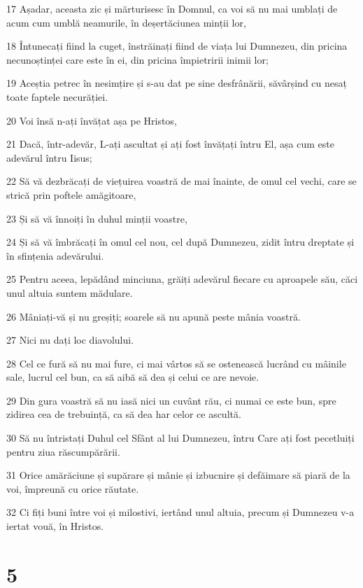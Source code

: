 \par 17 Așadar, aceasta zic și mărturisesc în Domnul, ca voi să nu mai umblați de acum cum umblă neamurile, în deșertăciunea minții lor,
\par 18 Întunecați fiind la cuget, înstrăinați fiind de viața lui Dumnezeu, din pricina necunoștinței care este în ei, din pricina împietririi inimii lor;
\par 19 Aceștia petrec în nesimțire și s-au dat pe sine desfrânării, săvârșind cu nesaț toate faptele necurăției.
\par 20 Voi însă n-ați învățat așa pe Hristos,
\par 21 Dacă, într-adevăr, L-ați ascultat și ați fost învățați întru El, așa cum este adevărul întru Iisus;
\par 22 Să vă dezbrăcați de viețuirea voastră de mai înainte, de omul cel vechi, care se strică prin poftele amăgitoare,
\par 23 Și să vă înnoiți în duhul minții voastre,
\par 24 Și să vă îmbrăcați în omul cel nou, cel după Dumnezeu, zidit întru dreptate și în sfințenia adevărului.
\par 25 Pentru aceea, lepădând minciuna, grăiți adevărul fiecare cu aproapele său, căci unul altuia suntem mădulare.
\par 26 Mâniați-vă și nu greșiți; soarele să nu apună peste mânia voastră.
\par 27 Nici nu dați loc diavolului.
\par 28 Cel ce fură să nu mai fure, ci mai vârtos să se ostenească lucrând cu mâinile sale, lucrul cel bun, ca să aibă să dea și celui ce are nevoie.
\par 29 Din gura voastră să nu iasă nici un cuvânt rău, ci numai ce este bun, spre zidirea cea de trebuință, ca să dea har celor ce ascultă.
\par 30 Să nu întristați Duhul cel Sfânt al lui Dumnezeu, întru Care ați fost pecetluiți pentru ziua răscumpărării.
\par 31 Orice amărăciune și supărare și mânie și izbucnire și defăimare să piară de la voi, împreună cu orice răutate.
\par 32 Ci fiți buni între voi și milostivi, iertând unul altuia, precum și Dumnezeu v-a iertat vouă, în Hristos.

\chapter{5}

